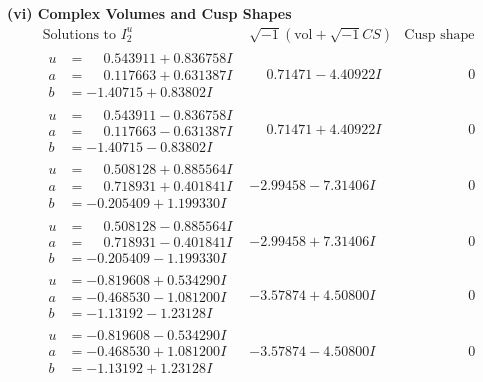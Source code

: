 \documentclass[1p]{elsarticle_modified}
\theoremstyle{definition}
\newcommand{\I}{\sqrt{-1}}
\begin{document}
\newpage\flushleft \textbf{(vi) Complex Volumes and Cusp Shapes}
$$\begin{array}{c|c|c}  
\text{Solutions to }I^u_{2}& \I (\text{vol} + \sqrt{-1}CS) & \text{Cusp shape}\\
 \hline 
\begin{aligned}
u &= \phantom{-}0.543911 + 0.836758 I \\
a &= \phantom{-}0.117663 + 0.631387 I \\
b &= -1.40715 + 0.83802 I\end{aligned}
 & \phantom{-}0.71471 - 4.40922 I & \phantom{-0.000000 } 0 \\ \hline\begin{aligned}
u &= \phantom{-}0.543911 - 0.836758 I \\
a &= \phantom{-}0.117663 - 0.631387 I \\
b &= -1.40715 - 0.83802 I\end{aligned}
 & \phantom{-}0.71471 + 4.40922 I & \phantom{-0.000000 } 0 \\ \hline\begin{aligned}
u &= \phantom{-}0.508128 + 0.885564 I \\
a &= \phantom{-}0.718931 + 0.401841 I \\
b &= -0.205409 + 1.199330 I\end{aligned}
 & -2.99458 - 7.31406 I & \phantom{-0.000000 } 0 \\ \hline\begin{aligned}
u &= \phantom{-}0.508128 - 0.885564 I \\
a &= \phantom{-}0.718931 - 0.401841 I \\
b &= -0.205409 - 1.199330 I\end{aligned}
 & -2.99458 + 7.31406 I & \phantom{-0.000000 } 0 \\ \hline\begin{aligned}
u &= -0.819608 + 0.534290 I \\
a &= -0.468530 - 1.081200 I \\
b &= -1.13192 - 1.23128 I\end{aligned}
 & -3.57874 + 4.50800 I & \phantom{-0.000000 } 0 \\ \hline\begin{aligned}
u &= -0.819608 - 0.534290 I \\
a &= -0.468530 + 1.081200 I \\
b &= -1.13192 + 1.23128 I\end{aligned}
 & -3.57874 - 4.50800 I & \phantom{-0.000000 } 0 \\ \hline\begin{aligned}

\end{aligned}
\end{array}$$
\end{document}
